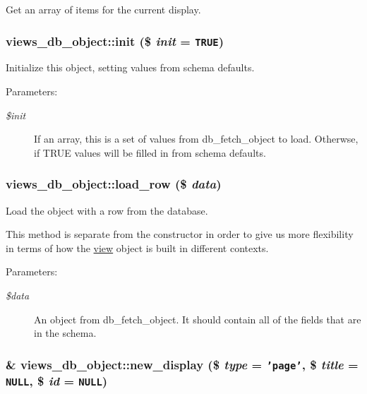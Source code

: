 Get an array of items for the current display. \hypertarget{classviews__db__object_5c50d8a10b9af37afa7c7c2bfde5e318}{
\subsubsection[{init}]{\setlength{\rightskip}{0pt plus 5cm}views\_\-db\_\-object::init (\$ {\em init} = {\tt TRUE})}}
\label{classviews__db__object_5c50d8a10b9af37afa7c7c2bfde5e318}


Initialize this object, setting values from schema defaults.

\begin{Desc}
\item[Parameters:]
\begin{description}
\item[{\em \$init}]If an array, this is a set of values from db\_\-fetch\_\-object to load. Otherwse, if TRUE values will be filled in from schema defaults. \end{description}
\end{Desc}
\hypertarget{classviews__db__object_4c8b658c58eb3ae319616f73a2106324}{
\subsubsection[{load\_\-row}]{\setlength{\rightskip}{0pt plus 5cm}views\_\-db\_\-object::load\_\-row (\$ {\em data})}}
\label{classviews__db__object_4c8b658c58eb3ae319616f73a2106324}


Load the object with a row from the database.

This method is separate from the constructor in order to give us more flexibility in terms of how the \hyperlink{classview}{view} object is built in different contexts.

\begin{Desc}
\item[Parameters:]
\begin{description}
\item[{\em \$data}]An object from db\_\-fetch\_\-object. It should contain all of the fields that are in the schema. \end{description}
\end{Desc}
\hypertarget{classviews__db__object_b7a8ea5c81d0c335d8e0fb87443349a3}{
\subsubsection[{new\_\-display}]{\setlength{\rightskip}{0pt plus 5cm}\& views\_\-db\_\-object::new\_\-display (\$ {\em type} = {\tt 'page'}, \/  \$ {\em title} = {\tt NULL}, \/  \$ {\em id} = {\tt NULL})}}
\label{classviews__db__object_b7a8ea5c81d0c335d8e0fb87443349a3}


